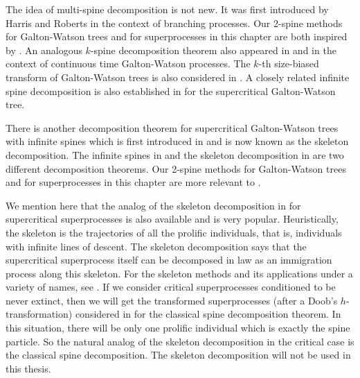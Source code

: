 \documentclass[UTF8]{pkuthss}
\theoremstyle{plain}
\theoremstyle{definition}
\numberwithin{equation}{section}
\begin{document}
	The idea of multi-spine decomposition is not new. It was first introduced by Harris and Roberts \cite{HarrisRoberts2017Manytofew} in the context of branching processes.
Our 2-spine methods for Galton-Watson trees \cite{RenSongSun20182spine} and for superprocesses in this chapter are both inspired by \cite{HarrisRoberts2017Manytofew}.
	An analogous $k$-spine decomposition theorem also appeared in \cite{HarrisJohnstonRoberts2017Coalescent} and \cite{Johnston2017Genealogy} in the context of continuous time Galton-Watson processes.
	The $k$-th size-biased transform of Galton-Watson trees is also considered in \cite{AbrahamDebs2018Penalization}.
	A closely related infinite spine decomposition is also established in \cite{AbrahamDebs2018Penalization} for the supercritical Galton-Watson tree.
	
	There is another decomposition theorem for supercritical Galton-Watson trees with infinite spines which is first introduced in \cite[Section 12]{AthreyaNey1972Branching} and is now known as the skeleton decomposition.
	The infinite spines in \cite{AbrahamDebs2018Penalization} and the skeleton decomposition 
	in \cite[Section 12]{AthreyaNey1972Branching} are two different decomposition theorems.
	Our 2-spine methods for Galton-Watson trees \cite{RenSongSun20182spine} and for
    superprocesses in this chapter are more relevant to \cite{AbrahamDebs2018Penalization}.



	We mention here that the analog of the skeleton decomposition in \cite[Section 12]{AthreyaNey1972Branching} for supercritical superprocesses is also available and is very popular.
	Heuristically, the skeleton is the trajectories of all the prolific individuals, that is, individuals with infinite lines of descent.
	The skeleton decomposition says that the supercritical superprocess itself can be decomposed in law as an immigration process along this skeleton.
	For the skeleton methods and its applications under a variety of names, see \cite{BerestyckiKyprianouMurillo-Salas2011Prolific,  BertoinFontbonaMartinez2008Prolific, DuquesneWinkel2007Growth, EckhoffKyprianouWinkel2015Spines, EnglanderPinsky1999Construction, EvansOConnell1994Weighted,  KyprianouPerezRen2014Backbone, KyprianouRen2012Backbone,  Milos2018Spatial,  RenSongZhang2014Central}.
	If we consider critical superprocesses conditioned to be never extinct,
	then we will get the transformed superprocesses (after a Doob's $h$-transformation) considered in \cite{EckhoffKyprianouWinkel2015Spines, EnglanderKyprianou2004Local, LiuRenSong2009Log} for the classical spine decomposition theorem. In this situation, there will be only one prolific individual which is exactly the spine particle.
	So the natural analog of the skeleton decomposition in the critical case is the classical spine decomposition.
	The skeleton decomposition will not be used in this thesis.
\end{document}
